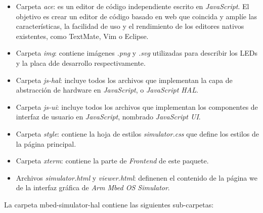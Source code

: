 \begin{itemize}
    \item Carpeta \textit{ace}: es un editor de código independiente escrito en \textit{JavaScript}. El objetivo es crear un editor de código basado en web que coincida y amplíe las características, la facilidad de uso y el rendimiento de los editores nativos existentes, como TextMate, Vim o Eclipse. 
    \item Carpeta \textit{img}: contiene imágenes \textit{.png} y \textit{.svg} utilizadas para describir los LEDs y la placa dde desarrollo respectivamente.
    \item Carpeta \textit{js-hal}: incluye todos los archivos que implementan la capa de abstracción de hardware en \textit{JavaScript}, o \textit{JavaScript HAL}.
    \item Carpeta \textit{js-ui}: incluye todos los archivos que implementan los componentes de interfaz de usuario en \textit{JavaScript}, nombrado \textit{JavaScript UI}.
    \item Carpeta \textit{style}: contiene la hoja de estilos \textit{simulator.css} que define los estilos de la página principal.
    \item Carpeta \textit{xterm}: contiene la parte de \textit{Frontend} de este paquete.
    \item Archivos \textit{simulator.html} y \textit{viewer.html}: definenen el contenido de la página we de la interfaz gráfica de \textit{Arm Mbed OS Simulator}.
\end{itemize}
 
La carpeta \textquotedbl mbed-simulator-hal\textquotedbl{} contiene las siguientes sub-carpetas: 

